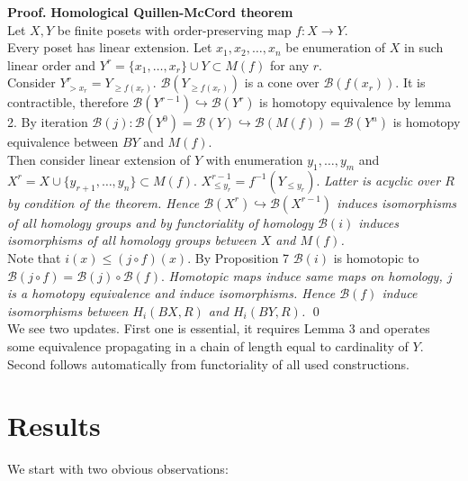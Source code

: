 \documentclass[a4paper, 12pt]{article}
\theoremstyle{definition}
\theoremstyle{remark}
\newenvironment{pf}{\noindent\textbf{Proof.}}{\qed}
\renewcommand{\leq}{\leqslant}
\renewcommand{\geq}{\geqslant}
\begin{document}
\begin{pf} \textbf{Homological Quillen-McCord theorem}\\
Let $X, Y$ be finite posets with order-preserving map $f : X \to Y$.\\

Every poset has linear extension. Let $x_1, x_2, \ldots, x_n$ be enumeration of $X$ in such linear order and $Y^r = \{x_1,\ldots,x_r\} \cup Y \subset M(f)$ for any $r$.\\

Consider $Y^r_{>x_r} = Y_{\geq f(x_r)}$. $\mathcal{B}(Y_{\geq f(x_r)})$ is a cone over $\mathcal{B}(f(x_r))$. It is contractible, therefore $\mathcal{B}(Y^{r-1}) \hookrightarrow \mathcal{B}(Y^{r})$ is homotopy equivalence by lemma 2. By iteration $\mathcal{B}(j) : \mathcal{B}(Y^{0}) = \mathcal{B}(Y) \hookrightarrow \mathcal{B}(M(f)) = \mathcal{B}(Y^n)$ is homotopy equivalence between $BY$ and $M(f)$.\\

Then consider linear extension of $Y$ with enumeration $y_1,\ldots,y_m$ and $X^r = X \cup \{y_{r+1},\ldots,y_n\} \subset M(f)$. $X^{r-1}_{\leq y_r} = f^{-1}(Y_{\leqslant y_r})$. \textit{Latter is acyclic over $R$ by condition of the theorem. Hence $\mathcal{B}(X^{r}) \hookrightarrow \mathcal{B}(X^{r-1})$ induces isomorphisms of all homology groups and by functoriality of homology $\mathcal{B}(i)$ induces isomorphisms of all homology groups between $X$ and $M(f)$.}\\

Note that $i(x) \leqslant (j \circ f)(x)$. By Proposition 7 $\mathcal{B}(i)$ is homotopic to $\mathcal{B}(j \circ f) = \mathcal{B}(j) \circ \mathcal{B}(f)$. \textit{Homotopic maps induce same maps on homology, $j$ is a homotopy equivalence and induce isomorphisms. Hence $\mathcal{B}(f)$ induce isomorphisms between $H_i(BX,R)$ and $H_i(BY,R)$.}
\end{pf}\\

We see two updates. First one is essential, it requires Lemma 3 and operates some equivalence propagating in a chain of length equal to cardinality of $Y$. Second follows automatically from functoriality of all used constructions.

\section{Results}

We start with two obvious observations:
\end{document}
